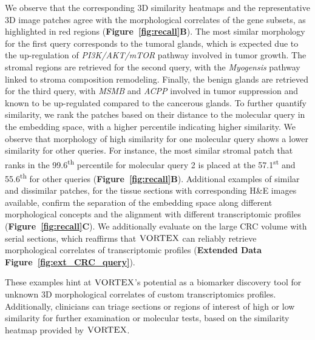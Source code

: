 We observe that the corresponding 3D similarity heatmaps and the representative 3D image patches agree with the morphological correlates of the gene subsets, as highlighted in red regions (\textbf{Figure~\ref{fig:recall}B}). The most similar morphology for the first query corresponds to the tumoral glands, which is expected due to the up-regulation of \textit{PI3K/AKT/mTOR} pathway involved in tumor growth\cite{berglund2018spatial, shorning2020pi3k}. The stromal regions are retrieved for the second query, with the \textit{Myogensis} pathway linked to stroma composition remodeling\cite{dakhova2014genes, ma2023prostate}. Finally, the benign glands are retrieved for the third query, with \textit{MSMB} and \textit{ACPP} involved in tumor suppression\cite{sjoblom2016microseminoprotein,veeramani2005cellular} and known to be up-regulated compared to the cancerous glands\cite{bjartell2007association, dahlman2011evaluation}.
To further quantify similarity, we rank the patches based on their distance to the molecular query in the embedding space, with a higher percentile indicating higher similarity. 
We observe that morphology of high similarity for one molecular query shows a lower similarity for other queries. For instance, the most similar stromal patch that ranks in the 99.6\textsuperscript{th} percentile for molecular query 2 is placed at the 57.1\textsuperscript{st} and 55.6\textsuperscript{th} for other queries (\textbf{Figure~\ref{fig:recall}B}). Additional examples of similar and dissimilar patches, for the tissue sections with corresponding H\&E images available, confirm the separation of the embedding space along different morphological concepts and the alignment with different transcriptomic profiles (\textbf{Figure~\ref{fig:recall}C}).
We additionally evaluate on the large CRC volume with serial sections, which reaffirms that $\textsc{VORTEX}$ can reliably retrieve morphological correlates of transcriptomic profiles (\textbf{Extended Data Figure~\ref{fig:ext_CRC_query}}).

These examples hint at $\textsc{VORTEX}$'s potential as a biomarker discovery tool for unknown 3D morphological correlates of custom transcriptomics profiles. Additionally, clinicians can triage sections or regions of interest of high or low similarity for further examination or molecular tests, based on the similarity heatmap provided by $\textsc{VORTEX}$.